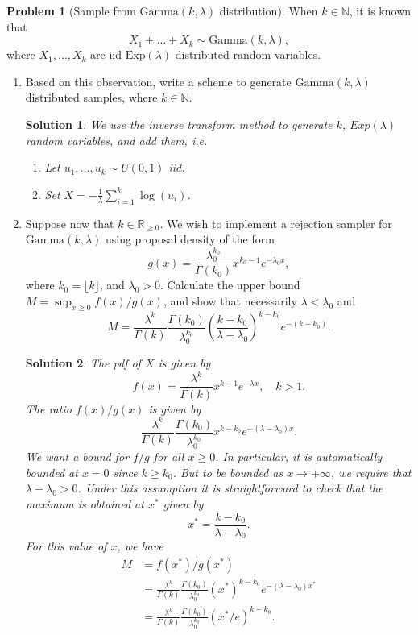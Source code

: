 \documentclass[11pt,a4paper]{article}
\theoremstyle{definition}
\newtheorem{problem}{Problem}
\theoremstyle{plain}
\newtheorem*{solution}{Solution}
\begin{document}
\begin{problem}
    [Sample from $\mbox{Gamma}(k, \lambda)$ distribution]
When $k \in \mathbb{N}$, it is known that
$$
  X_1 + \ldots + X_k \sim \mbox{Gamma}(k,\lambda),
$$
where $X_1, \ldots, X_k$ are iid $\mbox{Exp}(\lambda)$ distributed random variables.
\begin{enumerate}
\item Based on this observation, write a scheme to generate $\mbox{Gamma}(k, \lambda)$ distributed samples, where $k \in \mathbb{N}$.

\begin{solution}
We use the inverse transform method to generate $k$, $Exp(\lambda)$ random variables, and add them, i.e.
\begin{enumerate}
\item Let $u_1, \ldots, u_k \sim U(0,1)$ iid.
\item Set $X = -\frac{1}{\lambda}\sum_{i=1}^k \log(u_i)$.
\end{enumerate}
\end{solution}

\item Suppose now that $k \in \mathbb{R}_{\geq 0}$.  We wish to implement a rejection sampler for $\mbox{Gamma}(k, \lambda)$ using proposal density of the form
$$
  g(x) = \frac{\lambda_0^{k_0}}{\Gamma(k_0)}x^{k_0-1}e^{-\lambda_0 x},
$$
where $k_0 = \lfloor k \rfloor$, and $\lambda_0 > 0$.  Calculate the upper bound $M = \sup_{x \geq 0} f(x)/g(x)$, and show that necessarily $\lambda < \lambda_0$ and
$$
  M = \frac{\lambda^k}{\Gamma(k)}\frac{\Gamma(k_0)}{\lambda_0^{k_0}}\left(\frac{k-k_0}{\lambda-\lambda_0}\right)^{k-k_0}e^{-(k-k_0)}.
$$

\begin{solution}
The pdf of $X$ is given by
$$
   f(x) = \frac{\lambda^k}{\Gamma(k)}x^{k-1}e^{-\lambda x},\quad k > 1.
$$
The ratio $f(x)/g(x)$ is given by
$$
\frac{\lambda^k}{\Gamma(k)}\frac{\Gamma(k_0)}{\lambda_0^{k_0}}x^{k-k_0}e^{-(\lambda-\lambda_0)x}.
$$
We want a bound for $f/g$ for all $x\geq 0$.  In particular, it is automatically bounded at $x = 0$ since $k \geq k_0$.  But to be bounded as $x \rightarrow + \infty$, we require that $\lambda - \lambda_0 > 0$.  Under this assumption it is straightforward to check that the maximum is obtained at $x^*$ given by
$$
  x^* = \frac{k-k_0}{\lambda - \lambda_0}.
$$
For this value of $x$, we have
\begin{align*}
  M &= f(x^*)/g(x^*) \\
    &= \frac{\lambda^k}{\Gamma(k)}\frac{\Gamma(k_0)}{\lambda_0^{k_0}}(x^*)^{k-k_0}e^{-(\lambda-\lambda_0)x^*} \\
    &= \frac{\lambda^k}{\Gamma(k)}\frac{\Gamma(k_0)}{\lambda_0^{k_0}}(x^*/e)^{k-k_0}.
\end{align*}
\end{solution}


\end{enumerate}
\end{problem}
\end{document}
